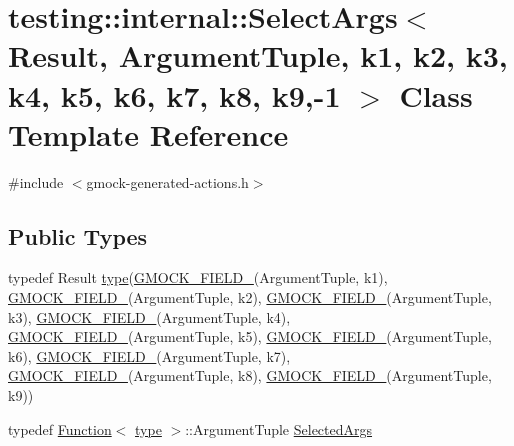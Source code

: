 \hypertarget{classtesting_1_1internal_1_1_select_args_3_01_result_00_01_argument_tuple_00_01k1_00_01k2_00_01kbad6295bde1bc89afd5e3dfe4d52ae94}{}\section{testing\+:\+:internal\+:\+:Select\+Args$<$ Result, Argument\+Tuple, k1, k2, k3, k4, k5, k6, k7, k8, k9,-\/1 $>$ Class Template Reference}
\label{classtesting_1_1internal_1_1_select_args_3_01_result_00_01_argument_tuple_00_01k1_00_01k2_00_01kbad6295bde1bc89afd5e3dfe4d52ae94}


{\ttfamily \#include $<$gmock-\/generated-\/actions.\+h$>$}

\subsection*{Public Types}
\begin{DoxyCompactItemize}
\item 
typedef Result \hyperlink{classtesting_1_1internal_1_1_select_args_3_01_result_00_01_argument_tuple_00_01k1_00_01k2_00_01kbad6295bde1bc89afd5e3dfe4d52ae94_aa370f95245d998aea225e3f24f3b9208}{type}(\hyperlink{gmock-generated-actions_8h_a6eb3ce92b0613603057a20ec9e593317}{G\+M\+O\+C\+K\+\_\+\+F\+I\+E\+L\+D\+\_\+}(Argument\+Tuple, k1), \hyperlink{gmock-generated-actions_8h_a6eb3ce92b0613603057a20ec9e593317}{G\+M\+O\+C\+K\+\_\+\+F\+I\+E\+L\+D\+\_\+}(Argument\+Tuple, k2), \hyperlink{gmock-generated-actions_8h_a6eb3ce92b0613603057a20ec9e593317}{G\+M\+O\+C\+K\+\_\+\+F\+I\+E\+L\+D\+\_\+}(Argument\+Tuple, k3), \hyperlink{gmock-generated-actions_8h_a6eb3ce92b0613603057a20ec9e593317}{G\+M\+O\+C\+K\+\_\+\+F\+I\+E\+L\+D\+\_\+}(Argument\+Tuple, k4), \hyperlink{gmock-generated-actions_8h_a6eb3ce92b0613603057a20ec9e593317}{G\+M\+O\+C\+K\+\_\+\+F\+I\+E\+L\+D\+\_\+}(Argument\+Tuple, k5), \hyperlink{gmock-generated-actions_8h_a6eb3ce92b0613603057a20ec9e593317}{G\+M\+O\+C\+K\+\_\+\+F\+I\+E\+L\+D\+\_\+}(Argument\+Tuple, k6), \hyperlink{gmock-generated-actions_8h_a6eb3ce92b0613603057a20ec9e593317}{G\+M\+O\+C\+K\+\_\+\+F\+I\+E\+L\+D\+\_\+}(Argument\+Tuple, k7), \hyperlink{gmock-generated-actions_8h_a6eb3ce92b0613603057a20ec9e593317}{G\+M\+O\+C\+K\+\_\+\+F\+I\+E\+L\+D\+\_\+}(Argument\+Tuple, k8), \hyperlink{gmock-generated-actions_8h_a6eb3ce92b0613603057a20ec9e593317}{G\+M\+O\+C\+K\+\_\+\+F\+I\+E\+L\+D\+\_\+}(Argument\+Tuple, k9))
\item 
typedef \hyperlink{structtesting_1_1internal_1_1_function}{Function}$<$ \hyperlink{classtesting_1_1internal_1_1_select_args_3_01_result_00_01_argument_tuple_00_01k1_00_01k2_00_01kbad6295bde1bc89afd5e3dfe4d52ae94_aa370f95245d998aea225e3f24f3b9208}{type} $>$\+::Argument\+Tuple \hyperlink{classtesting_1_1internal_1_1_select_args_3_01_result_00_01_argument_tuple_00_01k1_00_01k2_00_01kbad6295bde1bc89afd5e3dfe4d52ae94_a620901c52dc62d8ab6ca88625cb63dc5}{Selected\+Args}
\end{DoxyCompactItemize}

